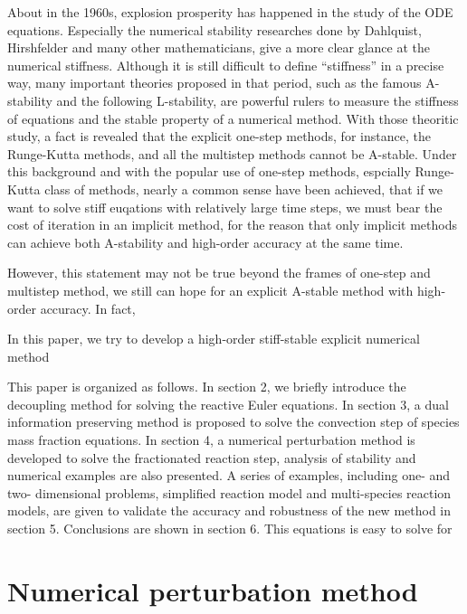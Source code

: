 \documentclass[review]{elsarticle}
\theoremstyle{plain}\newtheorem{definition}{\sc{Definition}}
\theoremstyle{defination}\newtheorem{example}{Example}[section]
\numberwithin{equation}{section}
\numberwithin{table}{section}
\begin{document}
{  About in the 1960s, explosion prosperity has happened in the study of the ODE equations. Especially the numerical stability researches done by Dahlquist, Hirshfelder and many other mathematicians, give a more clear glance at the numerical stiffness. Although it is still  difficult to define ``stiffness'' in a precise way, many important theories proposed in that period, such as the famous A-stability\cite{Germund1963A} and the following L-stability\cite{ehle1969pade}, are powerful rulers to measure the stiffness of equations and the stable property of a numerical method. With those theoritic study, a fact is revealed that the explicit one-step methods, for instance, the Runge-Kutta methods, and all the multistep methods cannot be A-stable. Under this background and with the popular use of one-step methods, espcially Runge-Kutta class of methods, nearly a common sense have been achieved, that if we want to solve stiff euqations with relatively large time steps, we must bear the cost of iteration in an implicit method, for the reason that only implicit methods can achieve both A-stability and high-order accuracy at the same time.  

However, this statement may not be true beyond the frames of one-step and multistep method, we still can hope for an explicit A-stable method with high-order accuracy.  In fact, 





 In this paper, we try to develop a high-order stiff-stable explicit numerical method 

This paper is organized as follows. In section 2, we briefly introduce the decoupling method for solving the reactive Euler equations. In section 3, a dual information preserving method is proposed to solve the convection step of species mass fraction equations. In section 4, a numerical perturbation method is developed to solve the fractionated reaction step, analysis of stability and numerical examples are also presented. A series of examples, including one- and two- dimensional problems, simplified reaction model and multi-species reaction models, are given to validate the accuracy and robustness of the new method in section 5. Conclusions are shown in section 6.
This equations is easy to solve for  


\section{Numerical perturbation method}

}
\end{document}
